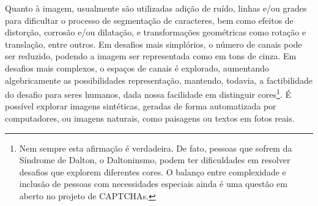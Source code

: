 Quanto à imagem, usualmente são utilizadas adição de ruído, linhas e/ou grades para dificultar o processo de segmentação de caracteres, bem como efeitos de distorção, corrosão e/ou dilatação, e transformações geométricas como rotação e translação, entre outros. Em desafios mais simplórios, o número de canais pode ser reduzido, podendo a imagem ser representada como em tons de cinza. Em desafios mais complexos, o espaços de canais é explorado, aumentando algebricamente as possibilidades representação, mantendo, todavia, a factibilidade do desafio para seres humanos, dada nossa facilidade em distinguir cores\footnote{Nem sempre esta afirmação é verdadeira. De fato, pessoas que sofrem da Síndrome de Dalton, o Daltoninsmo, podem ter dificuldades em resolver desafios que explorem diferentes cores. O balanço entre complexidade e inclusão de pessoas com necessidades especiais ainda é uma questão em aberto no projeto de CAPTCHAs.}. É possível explorar imagens sintéticas, geradas de forma automatizada por computadores, ou imagens naturais, como paisagens ou textos em fotos reais. 

